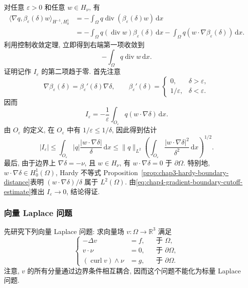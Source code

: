 \begin{Proof}
对任意 $\varepsilon>0$ 和任意 $w\in H_\nu$, 有
\begin{align*}
 \langle\nabla q,\beta_\varepsilon(\delta)w\rangle_{H^{-1},H_0^1}
 &=-\int_\Omega q\operatorname{div}(\beta_\varepsilon(\delta)w)\,\mathrm dx\\
 &=-\int_\Omega q(\operatorname{div}w)\beta_\varepsilon(\delta)\,\mathrm dx
 -\int_\Omega q(w\cdot\nabla\beta_\varepsilon(\delta))\,\mathrm dx.
\end{align*}
利用控制收敛定理, 立即得到右端第一项收敛到
\[
 -\int_\Omega q\operatorname{div}w\,\mathrm dx.
\]
证明记作 $I_\varepsilon$ 的第二项趋于零. 首先注意
\[
 \nabla\beta_\varepsilon(\delta)=\beta_\varepsilon'(\delta)\nabla\delta,
 \qquad
 \beta_\varepsilon'(\delta)=
 \begin{cases}
  0,&\delta>\varepsilon,\\
  1/\varepsilon,&\delta<\varepsilon.
 \end{cases}
\]
因而
\[
 I_\varepsilon=-\frac1\varepsilon\int_{O_\varepsilon}q(w\cdot\nabla\delta)\,\mathrm dx.
\]
由 $O_\varepsilon$ 的定义, 在 $O_\varepsilon$ 中有 $1/\varepsilon\leq1/\delta$, 因此得到估计
\begin{equation}
 |I_\varepsilon|
 \leq\int_{O_\varepsilon}|q|\frac{|w\cdot\nabla\delta|}{\delta}\,\mathrm dx
 \leq\|q\|_{L^2}
 \left(\int_{O_\varepsilon}\frac{|w\cdot\nabla\delta|^2}{\delta^2}\,\mathrm dx\right)^{1/2}.
 \label{eq:chap4-gradient-boundary-cutoff-estimate}
\end{equation}
最后, 由于边界上 $\nabla\delta=-\nu$, 且 $w\in H_\nu$, 有 $w\cdot\nabla\delta=0$ 于 $\partial\Omega$. 特别地, $w\cdot\nabla\delta\in H_0^1(\Omega)$, Hardy 不等式 Proposition~\ref{prop:chap3-hardy-boundary-distance}表明 $(w\cdot\nabla\delta)/\delta$ 属于 $L^2(\Omega)$. 由\eqref{eq:chap4-gradient-boundary-cutoff-estimate}推出 $I_\varepsilon\to0$, 结论得证.
\end{Proof}

\subsubsection{向量 Laplace 问题}
\label{subsec:chap4-vector-laplace-vorticity}

先研究下列向量 Laplace 问题: 求向量场 $v:\Omega\to\mathbb R^3$ 满足
\begin{equation}
 \left\{
 \begin{aligned}
  -\Delta v&=f,&&\text{于 }\Omega,\\
  v\cdot\nu&=0,&&\text{于 }\partial\Omega,\\
  (\operatorname{curl}v)\wedge\nu&=g,&&\text{于 }\partial\Omega.
 \end{aligned}
 \right.
 \label{eq:chap4-vector-laplace-vorticity}
\end{equation}
注意, $v$ 的所有分量通过边界条件相互耦合, 因而这个问题不能化为标量 Laplace 问题.

